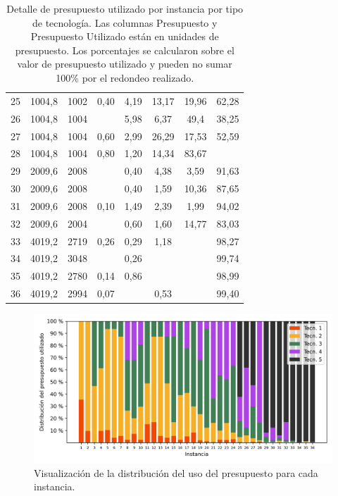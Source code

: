\begin{table}
\begin{tabular}{SSSSSSSS}
      25 & 1004,8 & 1002 & 0,40 & 4,19 & 13,17 & 19,96 & 62,28 \\
      26 & 1004,8 & 1004 &  & 5,98 & 6,37 & 49,4 & 38,25 \\
      27 & 1004,8 & 1004 & 0,60 & 2,99 & 26,29 & 17,53 & 52,59 \\
      28 & 1004,8 & 1004 & 0,80 & 1,20 & 14,34 & 83,67 &  \\
      29 & 2009,6 & 2008 &  & 0,40 & 4,38 & 3,59 & 91,63 \\
      30 & 2009,6 & 2008 &  & 0,40 & 1,59 & 10,36 & 87,65 \\
      31 & 2009,6 & 2008 & 0,10 & 1,49 & 2,39 & 1,99 & 94,02 \\
      32 & 2009,6 & 2004 &  & 0,60 & 1,60 & 14,77 & 83,03 \\
      33 & 4019,2 & 2719 & 0,26 & 0,29 & 1,18 &  & 98,27 \\
      34 & 4019,2 & 3048 &  & 0,26 &  &  & 99,74 \\
      35 & 4019,2 & 2780 & 0,14 & 0,86 &  &  & 98,99 \\
      36 & 4019,2 & 2994 & 0,07 &  & 0,53 &  & 99,40 \\
      \bottomrule
  \end{tabular}
  \caption{Detalle de presupuesto utilizado por instancia por tipo de tecnología. Las columnas Presupuesto y Presupuesto Utilizado están en unidades de presupuesto. Los porcentajes se calcularon sobre el valor de presupuesto utilizado y pueden no sumar 100\% por el redondeo realizado.} \label{table:sensibilitybudgetusage}
\end{table}

\clearpage
\begin{figure}[h!]
  \centering
  \includegraphics[width=\linewidth]{../resources/budget_use_by_infra.png}
  \caption{Visualización de la distribución del uso del presupuesto para cada instancia.}
  \label{fig:sensibilitybudgetusage}
\end{figure}

